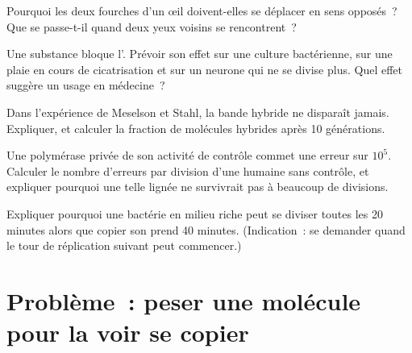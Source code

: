 \begin{exercise}[$\star\star$]\label{exo:g11:dna-replication:11}
Pourquoi les deux fourches d'un œil doivent-elles se déplacer en sens
opposés~? Que se passe-t-il quand deux yeux voisins se rencontrent~?
\end{exercise}

\begin{exercise}[$\star\star\star$]\label{exo:g11:dna-replication:12}
Une substance bloque l'. Prévoir son effet sur une
culture bactérienne, sur une plaie en cours de cicatrisation et sur un
neurone qui ne se divise plus. Quel effet suggère un usage en
médecine~?
\end{exercise}

\begin{exercise}[$\star\star\star$]\label{exo:g11:dna-replication:13}
Dans l'expérience de Meselson et Stahl, la bande hybride ne disparaît
jamais. Expliquer, et calculer la fraction de molécules hybrides après
10 générations.
\end{exercise}

\begin{exercise}[$\star\star\star$]\label{exo:g11:dna-replication:14}
Une polymérase privée de son activité de contrôle commet une erreur sur
$10^5$. Calculer le nombre d'erreurs par division d'une 
humaine sans contrôle, et expliquer pourquoi une telle lignée ne
survivrait pas à beaucoup de divisions.
\end{exercise}

\begin{exercise}[$\star\star\star$]\label{exo:g11:dna-replication:15}
Expliquer pourquoi une bactérie en milieu riche peut se diviser toutes
les 20 minutes alors que copier son  prend 40 minutes.
(Indication~: se demander quand le tour de réplication suivant peut
commencer.)
\end{exercise}

\section{Problème~: peser une molécule pour la voir se copier}

